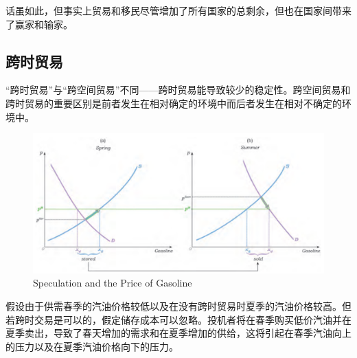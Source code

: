 \documentclass{article}
\begin{document}
话虽如此，但事实上贸易和移民尽管增加了所有国家的总剩余，但也在国家间带来了赢家和输家。

\subsection{跨时贸易}

“跨时贸易”与“跨空间贸易”不同——跨时贸易能导致较少的稳定性。跨空间贸易和跨时贸易的重要区别是前者发生在相对确定的环境中而后者发生在相对不确定的环境中。

\begin{figure}[H] %
	\centering %
	\includegraphics[width=1\textwidth]{20_8} %
	\caption{Speculation and the Price of Gasoline} %
	\label{Fig.main9} %
\end{figure}

假设由于供需春季的汽油价格较低以及在没有跨时贸易时夏季的汽油价格较高。但若跨时交易是可以的，假定储存成本可以忽略。投机者将在春季购买低价汽油并在夏季卖出，导致了春天增加的需求和在夏季增加的供给，这将引起在春季汽油向上的压力以及在夏季汽油价格向下的压力。







	
\end{document}
